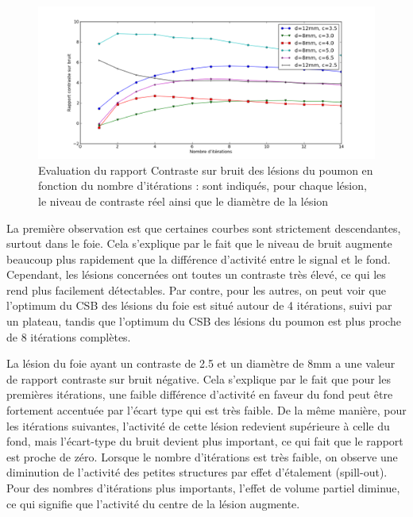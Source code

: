 \begin{figure}
\centering
\includegraphics[width=17cm]{images/CNRPoumon}
\caption[\'Evaluation du rapport "contraste sur bruit" des lésions du poumon en fonction du nombre d'itérations]{Evaluation du rapport Contraste sur bruit des lésions du poumon en fonction du nombre d'itérations : sont indiqués, pour chaque lésion, le niveau de contraste réel ainsi que le diamètre de la lésion}
\label{fig:CNRPoumon}
\end{figure}

La première observation est que certaines courbes sont strictement descendantes, surtout dans le foie. Cela s'explique par le fait que le niveau de bruit augmente beaucoup plus rapidement que la différence d'activité entre le signal et le fond. Cependant, les lésions concernées ont toutes un contraste très élevé, ce qui les rend plus facilement détectables. Par contre, pour les autres, on peut voir que l'optimum du CSB des lésions du foie est situé autour de 4 itérations, suivi par un plateau, tandis que l'optimum du CSB des lésions du poumon est plus proche de 8 itérations complètes.

La lésion du foie ayant un contraste de 2.5 et un diamètre de 8mm a une valeur de rapport contraste sur bruit négative. Cela s'explique par le fait que pour les premières itérations, une faible différence d'activité en faveur du fond peut être fortement accentuée par l'écart type qui est très faible. De la même manière, pour les itérations suivantes, l'activité de cette lésion redevient supérieure à celle du fond, mais l'écart-type du bruit devient plus important, ce qui fait que le rapport est proche de zéro. Lorsque le nombre d'itérations est très faible, on observe une diminution de l'activité des petites structures par effet d'étalement (spill-out). Pour des nombres d'itérations plus importants, l'effet de volume partiel diminue, ce qui signifie que l'activité du centre de la lésion augmente.

